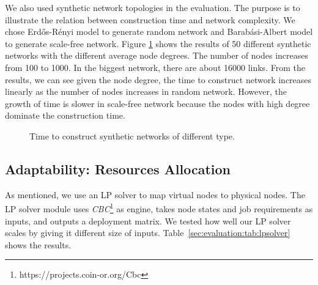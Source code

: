 \documentclass[conference]{IEEEtran}
\begin{document}
We also used synthetic network topologies in the evaluation. The
purpose is to illustrate the relation between construction time and
network complexity. We chose Erd\H{o}s-R\'{e}nyi model to generate
random network and Barab\'{a}si-Albert model to generate scale-free
network.  Figure \ref{sec:evaluation:fig:topology} shows the results
of 50 different synthetic networks with the different average node
degrees. The number of nodes increases from 100 to 1000. In the
biggest network, there are about 16000 links.  From the results, we
can see given the node degree, the time to construct network increases
linearly as the number of nodes increases in random network. However,
the growth of time is slower in scale-free network because the nodes
with high degree dominate the construction time.





\begin{figure}[!tb]
  \centering {}
  \quad {}
  \caption{Time to construct synthetic networks of different type.}
  \label{sec:evaluation:fig:topology}
  \vskip -2mm
\end{figure}





\subsection{Adaptability: Resources Allocation}
\label{sec:evaluation:smart}

As mentioned, we use an LP solver to map virtual nodes to physical
nodes.
The LP solver module uses
\textit{CBC}\footnote{https://projects.coin-or.org/Cbc} as engine,
takes node states and job requirements as inputs, and outputs a
deployment matrix.
We tested how well our LP solver scales by giving it different size of
inputs. Table~\ref{sec:evaluation:tab:lpsolver} shows the results.
\end{document}
